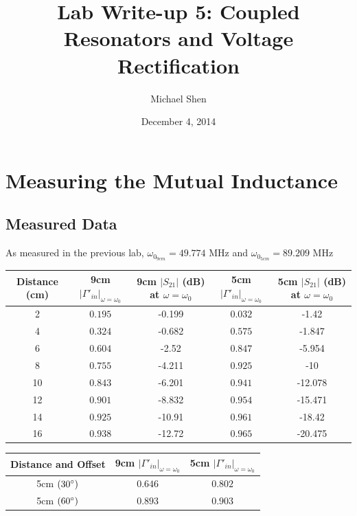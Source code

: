 \documentclass{article}
\begin{document}
\title{Lab Write-up 5: Coupled Resonators and Voltage Rectification}
\author{Michael Shen}
\date{December 4, 2014}
\maketitle


\section{Measuring the Mutual Inductance}

\subsection{Measured Data}
As measured in the previous lab, $\omega_{0_{9cm}} = 49.774$ MHz and $\omega_{0_{5cm}} = 89.209$ MHz

\begin{table}[H]
\centering
\begin{tabular}{|c|c|c|c|c|}
\hline
Distance (cm)& 9cm $\vert\Gamma '_{in}\vert_{\omega=\omega_0}$     
			 & 9cm $\vert S_{21}\vert$ (dB) at $\omega = \omega_0$
			 & 5cm $\vert\Gamma '_{in}\vert_{\omega=\omega_0}$     
			 & 5cm $\vert S_{21}\vert$ (dB) at $\omega = \omega_0$ \\ \hline
2   		 & $0.195$  & -0.199 & $0.032$  & -1.42   \\ \hline
4   	 	 & $0.324$  & -0.682 & $0.575$  & -1.847  \\ \hline
6   	 	 & $0.604$  & -2.52  & $0.847$  & -5.954  \\ \hline
8		     & $0.755$  & -4.211 & $0.925$  & -10     \\ \hline
10  		 & $0.843$  & -6.201 & $0.941$  & -12.078 \\ \hline
12 			 & $0.901$  & -8.832 & $0.954$  & -15.471 \\ \hline
14 			 & $0.925$  & -10.91 & $0.961$  & -18.42  \\ \hline
16  		 & $0.938$  & -12.72 & $0.965$  & -20.475 \\ \hline
\end{tabular}
\end{table}

\begin{table}[h]
\centering
\begin{tabular}{|c|c|c|}
\hline
Distance and Offset	  & 9cm $\vert\Gamma '_{in}\vert_{\omega=\omega_0}$      
			 	  & 5cm $\vert\Gamma '_{in}\vert_{\omega=\omega_0}$ \\ \hline
5cm $(30\degree)$ & $0.646$ & $0.802$   \\ \hline
5cm $(60\degree)$ & $0.893$ & $0.903$ \\ \hline
\end{tabular}
\end{table}
\end{document}
